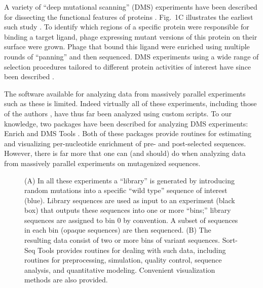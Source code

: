 \documentclass{bmcart}
\begin{document}
A variety of ``deep mutational scanning'' (DMS) experiments have been described for dissecting the functional features of proteins \cite{Fowler:2014gq}. Fig.\ 1C illustrates the earliest such study \cite{Fowler:2011js}. To identify which regions of a specific protein were responsible for binding a target ligand, phage expressing mutant versions of this protein on their surface were grown. Phage that bound this ligand were enriched using multiple rounds of ``panning'' and then sequenced. DMS experiments using a wide range of selection procedures tailored to different protein activities of interest have since been described \cite{Fowler:2014gq}. 

The software available for analyzing data from massively parallel experiments such as these is limited. Indeed virtually all of these experiments, including those of the authors \cite{Kinney:2010tn,RazoMejia:2014fo}, have thus far been analyzed using custom scripts. To our knowledge, two packages have been described for analyzing DMS experiments: Enrich \cite{Fowler:2011js} and DMS Tools \cite{Bloom:2015jz}. Both of these packages provide routines for estimating and visualizing per-nucleotide enrichment of pre- and post-selected sequences. However, there is far more that one can (and should) do when analyzing data from massively parallel experiments on  mutagenized sequences. 

%
%
\begin{figure}[h!]
\caption{
(A) In all these experiments a ``library'' is generated by introducing random mutations into a specific ``wild type'' sequence of interest (blue). Library sequences are used as input to an experiment (black box) that outputs these sequences into one or more ``bins;'' library sequences are assigned to bin 0 by convention. A subset of sequences in each bin (opaque sequences) are then sequenced.  (B) The resulting data consist of two or more bins of variant sequences. Sort-Seq Tools provides routines for dealing with such data, including routines for preprocessing, simulation, quality control, sequence analysis, and quantitative modeling. Convenient visualization methods are also provided.
}
\label{fig:form}
\end{figure}
\end{document}
